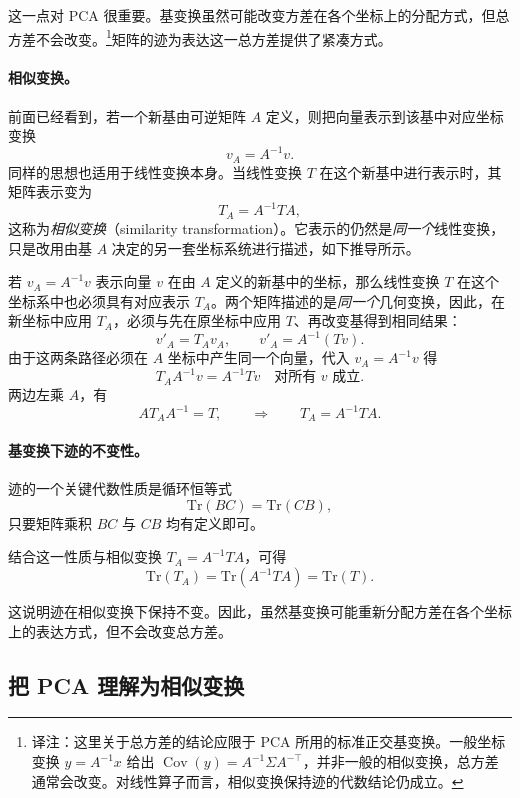 这一点对 PCA 很重要。基变换虽然可能改变方差在各个坐标上的分配方式，但总方差不会改变。\footnote{译注：这里关于总方差的结论应限于 PCA 所用的标准正交基变换。一般坐标变换 \(y=A^{-1}x\) 给出 \(\operatorname{Cov}(y)=A^{-1}\Sigma A^{-\top}\)，并非一般的相似变换，总方差通常会改变。对线性算子而言，相似变换保持迹的代数结论仍成立。}矩阵的迹为表达这一总方差提供了紧凑方式。

\paragraph{相似变换。}
前面已经看到，若一个新基由可逆矩阵 \(A\) 定义，则把向量表示到该基中对应坐标变换
\[
v_A = A^{-1}v.
\]
同样的思想也适用于线性变换本身。当线性变换 \(T\) 在这个新基中进行表示时，其矩阵表示变为
\[
T_A = A^{-1}TA,
\]
这称为\emph{相似变换}（similarity transformation）。它表示的仍然是\emph{同一个}线性变换，只是改用由基 \(A\) 决定的另一套坐标系统进行描述，如下推导所示。

\begin{tcolorbox}[
  colback=blue!6,
  colframe=blue!55!black,
  title={为什么 $T_A = A^{-1} T A$},
  boxrule=0.8pt,
  arc=2mm,
  left=2mm,
  right=2mm,
  top=1mm,
  bottom=1mm
]
若 \(v_A=A^{-1}v\) 表示向量 \(v\) 在由 \(A\) 定义的新基中的坐标，那么线性变换 \(T\) 在这个坐标系中也必须具有对应表示 \(T_A\)。两个矩阵描述的是\emph{同一个}几何变换，因此，在新坐标中应用 \(T_A\)，必须与先在原坐标中应用 \(T\)、再改变基得到相同结果：
\[
v'_A = T_A v_A,
\qquad
v'_A = A^{-1}(Tv).
\]
由于这两条路径必须在 \(A\) 坐标中产生同一个向量，代入 \(v_A=A^{-1}v\) 得
\[
T_A A^{-1}v = A^{-1}Tv
\quad\text{对所有 }v\text{ 成立}.
\]
两边左乘 \(A\)，有
\[
A T_A A^{-1}=T,
\qquad\Longrightarrow\qquad
T_A=A^{-1}TA.
\]
\end{tcolorbox}

\paragraph{基变换下迹的不变性。}

迹的一个关键代数性质是循环恒等式
\[
\mathrm{Tr}(BC)=\mathrm{Tr}(CB),
\]
只要矩阵乘积 \(BC\) 与 \(CB\) 均有定义即可。

结合这一性质与相似变换 \(T_A=A^{-1}TA\)，可得
\[
\mathrm{Tr}(T_A)
=
\mathrm{Tr}(A^{-1}TA)
=
\mathrm{Tr}(T).
\]

这说明迹在相似变换下保持不变。因此，虽然基变换可能重新分配方差在各个坐标上的表达方式，但不会改变总方差。

\subsection{把 PCA 理解为相似变换}

